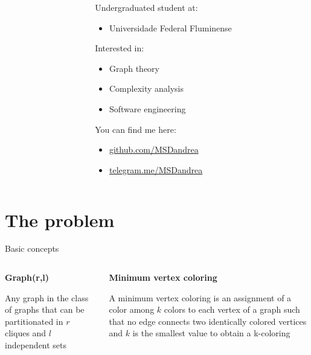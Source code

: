 \documentclass[9pt, compress]{beamer}
\begin{document}
\begin{frame}
\begin{columns}
\begin{column}{0.3\textwidth}
          \end{column}
          \begin{column}{0.5\textwidth}
            Undergraduated student at:
            \begin{itemize}
              \item Universidade Federal Fluminense
            \end{itemize}
            
            Interested in:
            \begin{itemize}
              \item Graph theory
              \item Complexity analysis
              \item Software engineering
            \end{itemize}
            
            You can find me here:
            \begin{itemize}
              \item \url{github.com/MSDandrea}
              \item \url{telegram.me/MSDandrea}
            \end{itemize}
          \end{column}
        \end{columns}
    \end{frame}
    \section{The problem}
    \begin{frame}{Basic concepts}
      \begin{columns}
        \begin{column}{0.5\textwidth}
          \textbf{Graph(r,l)}
          
          Any graph in the class of graphs that can be partitionated in $r$ cliques and $l$ independent sets
        \end{column}
        \begin{column}{0.5\textwidth}
          \textbf{Minimum vertex coloring}
          
          A minimum vertex coloring is an assignment of a color among $k$ colors to each vertex of a graph such that no edge connects two identically colored vertices and $k$ is the smallest value to obtain a k-coloring
        \end{column}
      \end{columns}
    \end{frame}
\end{document}
